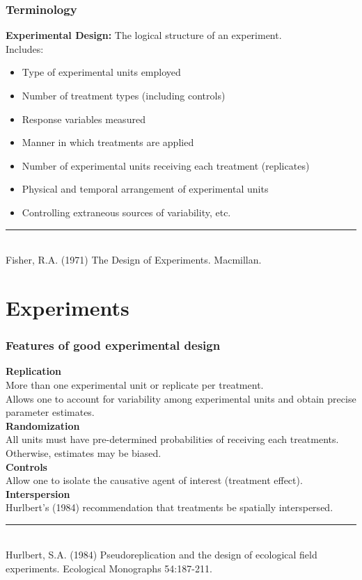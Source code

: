 \documentclass[color=usenames,dvipsnames]{beamer}\usepackage[]{graphicx}\usepackage[]{color}
\begin{document}
\begin{frame}
  \frametitle{Terminology}
  {\bf Experimental Design:} %
  The logical structure of an experiment. \\ %
  \vspace{6pt}
  \vfill  
  Includes:
  \begin{itemize}
    \item Type of experimental units employed
    \item Number of treatment types (including controls)
    \item Response variables measured
    \item Manner in which treatments are applied
    \item Number of experimental units receiving each treatment (replicates)
    \item Physical and temporal arrangement of experimental units
    \item Controlling extraneous sources of variability, etc.
  \end{itemize}
  \vfill
  \vspace{6pt}
  \rule[0mm]{1cm}{0.1mm} \\
  \footnotesize
  Fisher, R.A. (1971) The Design of Experiments. Macmillan. 
\end{frame}




\section{Experiments}


\begin{frame}
  \frametitle{Features of good experimental design}
  \pause
  \small
  {\bf Replication} \\
  More than one experimental unit or replicate per treatment. \\
  Allows one to account for variability among experimental units and
  obtain precise parameter estimates. \\
  \pause
  \vfill
  {\bf Randomization} \\
  All units must have pre-determined probabilities of receiving each
  treatments. Otherwise, estimates may be biased. \\
  \pause
  \vfill
  {\bf Controls} \\
  Allow one to isolate the causative agent of interest (treatment
  effect). \\ %
  \pause
  \vfill
  {\bf Interspersion} \\
  Hurlbert's (1984) recommendation that treatments be spatially interspersed.  \\
  \vspace{1pt}
  \rule[0mm]{1cm}{0.1mm} \\
  \footnotesize
  Hurlbert, S.A. (1984) Pseudoreplication and the design of ecological field
  experiments.  Ecological Monographs 54:187-211.
\end{frame}
\end{document}
